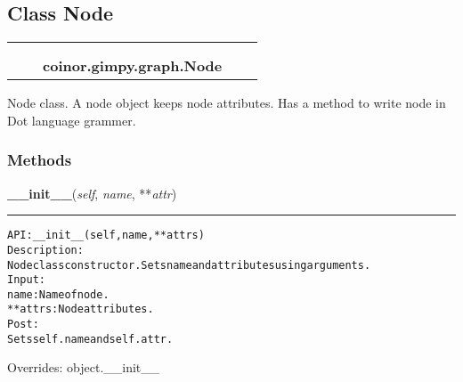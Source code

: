 
\subsection{Class Node}

    \label{coinor:gimpy:graph:Node}
\begin{tabular}{cccccc}
\multicolumn{2}{r}{\settowidth{\BCL}{object}\multirow{2}{\BCL}{object}}
&&
  \\\cline{3-3}
  &&\multicolumn{1}{c|}{}
&&
  \\
&&\multicolumn{2}{l}{\textbf{coinor.gimpy.graph.Node}}
\end{tabular}

Node class. A node object keeps node attributes. Has a method to write node
in Dot language grammer.



  \subsubsection{Methods}

    \vspace{0.5ex}

\hspace{.8\funcindent}\begin{boxedminipage}{\funcwidth}

    \raggedright \textbf{\_\_init\_\_}(\textit{self}, \textit{name}, **\textit{attr})

    \vspace{-1.5ex}

    \rule{\textwidth}{0.5\fboxrule}
\setlength{\parskip}{2ex}
\begin{alltt}

API: \_\_init\_\_(self, name, **attrs)
Description:
Node class constructor. Sets name and attributes using arguments.
Input:
    name: Name of node.
    **attrs: Node attributes.
Post:
    Sets self.name and self.attr.
\end{alltt}

\setlength{\parskip}{1ex}
      Overrides: object.\_\_init\_\_

    \end{boxedminipage}

